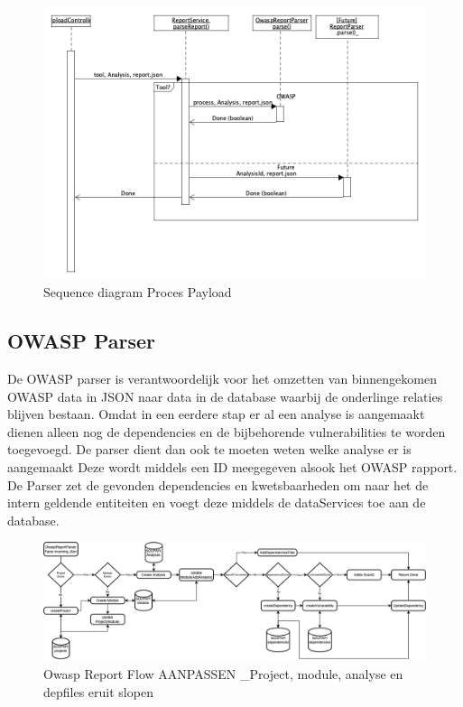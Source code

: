 \begin{figure}[bth]
    \myfloatalign
    \includegraphics[width=14cm]{gfx/umlet/exports/SeqProcessPayload}
    \caption{Sequence diagram Proces Payload}
    \label{fig:ProcesPayload}
\end{figure}

\subsection{OWASP Parser}\label{subsec:owasp-parser}
De OWASP parser is verantwoordelijk voor het omzetten van binnengekomen OWASP data in JSON naar data in de database waarbij de onderlinge relaties blijven bestaan.
Omdat in een eerdere stap er al een analyse is aangemaakt dienen alleen nog de dependencies en de bijbehorende vulnerabilities te worden toegevoegd.
De parser dient dan ook te moeten weten welke analyse er is aangemaakt Deze wordt middels een ID meegegeven alsook het OWASP rapport. De Parser zet de gevonden dependencies en kwetsbaarheden om naar het de intern geldende entiteiten en voegt deze middels de dataServices toe aan de database.

\begin{figure}[H]
    \myfloatalign
    \includegraphics[width=15cm]{gfx/SOUPAPI-ReportParseFlow}
    \caption{Owasp Report Flow AANPASSEN _Project, module, analyse en depfiles eruit slopen}
    \label{fig:OwaspReportFlow}
\end{figure}


